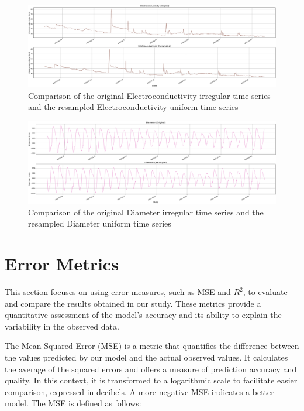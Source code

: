 \begin{figure}[htbp]
    \centering
    \includegraphics[width=15 cm]{5_ChapterDesign/figuras/5_Irregular/comparison_Electroconductivity.pdf}
    \caption{Comparison of the original Electroconductivity irregular time series and the resampled Electroconductivity uniform time series}
    \label{comparison_Electroconductivity}
\end{figure}

\begin{figure}[htbp]
    \centering
    \includegraphics[width=15 cm]{5_ChapterDesign/figuras/5_Irregular/comparison_Diameter.pdf}
    \caption{Comparison of the original Diameter irregular time series and the resampled Diameter uniform time series}
    \label{comparison_Diameter}
\end{figure}

\section{Error Metrics}

This section focuses on using error measures, such as MSE and \( R^2 \), to evaluate and compare the results obtained in our study. These metrics provide a quantitative assessment of the model's accuracy and its ability to explain the variability in the observed data.

The Mean Squared Error (MSE) is a metric that quantifies the difference between the values predicted by our model and the actual observed values. It calculates the average of the squared errors and offers a measure of prediction accuracy and quality. In this context, it is transformed to a logarithmic scale to facilitate easier comparison, expressed in decibels. A more negative MSE indicates a better model. The MSE is defined as follows:


